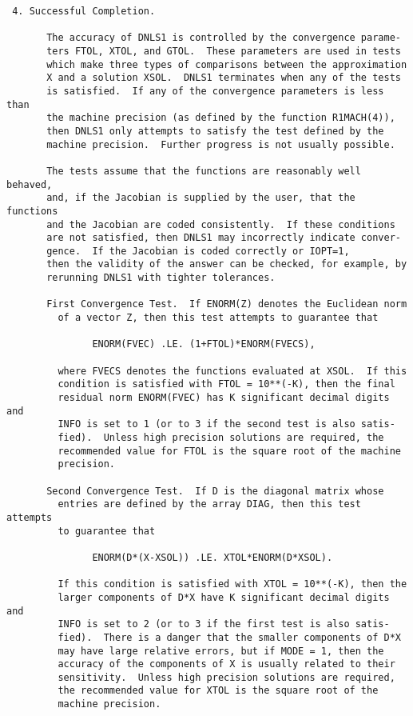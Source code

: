 \begin{verbatim}
 4. Successful Completion.

       The accuracy of DNLS1 is controlled by the convergence parame-
       ters FTOL, XTOL, and GTOL.  These parameters are used in tests
       which make three types of comparisons between the approximation
       X and a solution XSOL.  DNLS1 terminates when any of the tests
       is satisfied.  If any of the convergence parameters is less than
       the machine precision (as defined by the function R1MACH(4)),
       then DNLS1 only attempts to satisfy the test defined by the
       machine precision.  Further progress is not usually possible.

       The tests assume that the functions are reasonably well behaved,
       and, if the Jacobian is supplied by the user, that the functions
       and the Jacobian are coded consistently.  If these conditions
       are not satisfied, then DNLS1 may incorrectly indicate conver-
       gence.  If the Jacobian is coded correctly or IOPT=1,
       then the validity of the answer can be checked, for example, by
       rerunning DNLS1 with tighter tolerances.

       First Convergence Test.  If ENORM(Z) denotes the Euclidean norm
         of a vector Z, then this test attempts to guarantee that

               ENORM(FVEC) .LE. (1+FTOL)*ENORM(FVECS),

         where FVECS denotes the functions evaluated at XSOL.  If this
         condition is satisfied with FTOL = 10**(-K), then the final
         residual norm ENORM(FVEC) has K significant decimal digits and
         INFO is set to 1 (or to 3 if the second test is also satis-
         fied).  Unless high precision solutions are required, the
         recommended value for FTOL is the square root of the machine
         precision.

       Second Convergence Test.  If D is the diagonal matrix whose
         entries are defined by the array DIAG, then this test attempts
         to guarantee that

               ENORM(D*(X-XSOL)) .LE. XTOL*ENORM(D*XSOL).

         If this condition is satisfied with XTOL = 10**(-K), then the
         larger components of D*X have K significant decimal digits and
         INFO is set to 2 (or to 3 if the first test is also satis-
         fied).  There is a danger that the smaller components of D*X
         may have large relative errors, but if MODE = 1, then the
         accuracy of the components of X is usually related to their
         sensitivity.  Unless high precision solutions are required,
         the recommended value for XTOL is the square root of the
         machine precision.


\end{verbatim}
